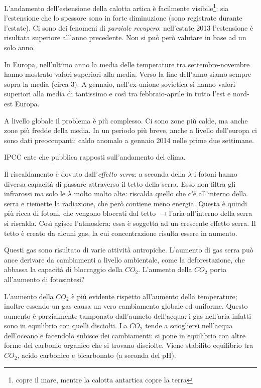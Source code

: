 \documentclass[a4paper,12pt]{book}
\newcommand{\lfreccia}{\ensuremath{\longrightarrow}}
\begin{document}
L'andamento dell'estensione della calotta artica è facilmente visibile\footnote{copre il mare, mentre la calotta antartica copre la terra}: sia l'estensione che lo spessore sono in forte diminuzione (sono registrate durante l'estate). Ci sono dei fenomeni di \emph{parziale recupero}: nell'estate 2013 l'estensione è risultata superiore all'anno precedente. Non si può però valutare in base ad un solo anno.

In Europa, nell'ultimo anno la media delle temperature tra settembre-novembre hanno mostrato valori superiori alla media. Verso la fine dell'anno siamo sempre sopra la media (circa 3\textcelsius). A gennaio, nell'ex-unione sovietica si hanno valori superiori alla media di tantissimo e così tra febbraio-aprile in tutto l'est e nord-est Europa.

A livello globale il problema è più complesso. Ci sono zone più calde, ma anche zone più fredde della media. In un periodo più breve, anche a livello dell'europa ci sono dati preoccupanti: caldo anomalo a gennaio 2014 nelle prime due settimane.

IPCC ente che pubblica rapposti sull'andamento del clima.

Il riscaldamento è dovuto dall'\emph{effetto serra}: a seconda della $\lambda$ i fotoni hanno diversa capacità di passare attraverso il tetto della serra. Esso non filtra gli infrarossi ma solo le $\lambda$ molto molto alte: riscalda quello che c'è all'interno della serra e riemette la radiazione, che però contiene meno energia. Questa è quindi più ricca di fotoni, che vengono bloccati dal tetto \lfreccia l'aria all'interno della serra si riscalda. Così agisce l'atmosfera: essa è soggetta ad un crescente effetto serra. Il tetto è creato da alcuni gas, la cui concentrazione risulta essere in aumento.

Questi gas sono risultato di varie attività antropiche. L'aumento di gas serra può ance derivare da cambiamenti a livello ambientale, come la deforestazione, che abbassa la capacità di bloccaggio della $CO_{2}$. L'aumento della $CO_{2}$ porta all'aumento di fotosintesi?

L'aumento della $CO_{2}$ è più evidente rispetto all'aumento della temperature; inoltre essendo un gas causa un vero cambiamento globale ed uniforme. Questo aumento è parzialmente tamponato dall'aumeto dell'acqua: i gas nell'aria infatti sono in equilibrio con quelli disciolti. La $CO_{2}$ tende a sciogliersi nell'acqua dell'oceano e facendolo subisce dei cambiamenti: si pone in equilibrio con altre forme del carbonio organico che si trovano disciolte. Viene stabilito equilibrio tra $CO_{2}$, acido carbonico e bicarbonato (a seconda del pH).
\end{document}
